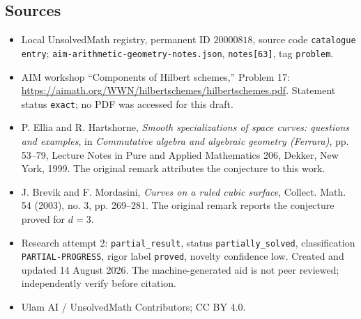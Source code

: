 \documentclass[11pt]{article}
\begin{document}
\subsection{Sources}
\begin{itemize}
\item Local UnsolvedMath registry, permanent ID \(20000818\), source code \texttt{catalogue entry}; \texttt{aim-arithmetic-geometry-notes.json}, \texttt{notes[63]}, tag \texttt{problem}.
\item AIM workshop ``Components of Hilbert schemes,'' Problem 17: \url{https://aimath.org/WWN/hilbertschemes/hilbertschemes.pdf}. Statement status \texttt{exact}; no PDF was accessed for this draft.
\item P. Ellia and R. Hartshorne, \emph{Smooth specializations of space curves: questions and examples}, in \emph{Commutative algebra and algebraic geometry (Ferrara)}, pp. 53--79, Lecture Notes in Pure and Applied Mathematics 206, Dekker, New York, 1999. The original remark attributes the conjecture to this work.
\item J. Brevik and F. Mordasini, \emph{Curves on a ruled cubic surface}, Collect. Math. 54 (2003), no. 3, pp. 269--281. The original remark reports the conjecture proved for \(d=3\).
\item Research attempt 2: \texttt{partial\_result}, status \texttt{partially\_solved}, classification \texttt{PARTIAL-PROGRESS}, rigor label \texttt{proved}, novelty confidence low. Created and updated 14 August 2026. The machine-generated aid is not peer reviewed; independently verify before citation.
\item Ulam AI / UnsolvedMath Contributors; CC BY 4.0.
\end{itemize}
\end{document}
